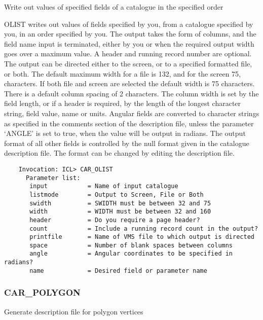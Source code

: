Write out values of specified fields of a catalogue in the specified
order

OLIST writes out values of fields specified by you, from a
catalogue specified by you, in an order specified by you.
The output takes the form of columns, and the field name input is
terminated, either by you or when the required output width goes
over a maximum value.
A header and running record number are optional.
The output can be directed either to the screen, or to a specified
formatted file, or both.
The default maximum width for a file is 132, and for the screen 75,
characters.
If both file and screen are selected the default width is 75 characters.
There is a default column spacing of 2 characters.
The column width is set by the field length, or if a header is required,
by the length of the longest character string, field value, name or units.
Angular fields are converted to character strings as specified in
the comments section of the description file, unless the parameter
`ANGLE' is set to true, when the value will be output in radians.
The output format of all other fields is controlled by the null
format given in the catalogue description file.  The format can be
changed by editing the description file.
\begin{verbatim}
    Invocation: ICL> CAR_OLIST
      Parameter list:
       input           = Name of input catalogue
       listmode        = Output to Screen, File or Both
       swidth          = SWIDTH must be between 32 and 75
       width           = WIDTH must be between 32 and 160
       header          = Do you require a page header?
       count           = Include a running record count in the output?
       printfile       = Name of VMS file to which output is directed
       space           = Number of blank spaces between columns
       angle           = Angular coordinates to be specified in radians?
       name            = Desired field or parameter name
\end{verbatim}

\subsubsection{CAR\_POLYGON}

Generate description file for polygon vertices

